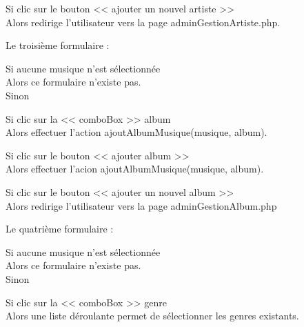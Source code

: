 			\begin{paragraphe}
				Si clic sur le bouton << ajouter un nouvel artiste >> \\
				Alors redirige l'utilisateur vers la page adminGestionArtiste.php.
			\end{paragraphe}

			\begin{paragraphe}
				Le troisième formulaire :
			\end{paragraphe}

			\begin{paragraphe}
				Si aucune musique n'est sélectionnée \\
				Alors ce formulaire n'existe pas. \\
				Sinon
			\end{paragraphe}

			\begin{paragraphe}
				Si clic sur la << comboBox >> album \\
				Alors effectuer l'action ajoutAlbumMusique(musique, album).
			\end{paragraphe}

			\begin{paragraphe}
				Si clic sur le bouton << ajouter album >> \\
				Alors effectuer l'acion ajoutAlbumMusique(musique, album).
			\end{paragraphe}

			\begin{paragraphe}
				Si clic sur le bouton << ajouter un nouvel album >> \\
				Alors redirige l'utilisateur vers la page adminGestionAlbum.php
			\end{paragraphe}

			\begin{paragraphe}
				Le quatrième formulaire :
			\end{paragraphe}

			\begin{paragraphe}
				Si aucune musique n'est sélectionnée \\
				Alors ce formulaire n'existe pas. \\
				Sinon
			\end{paragraphe}

			\begin{paragraphe}
				Si clic sur la << comboBox >> genre \\
				Alors une liste déroulante permet de sélectionner les genres existants.
			\end{paragraphe}

